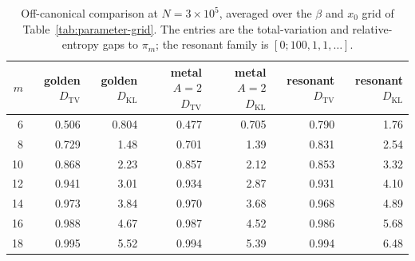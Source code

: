 \begin{table}[t]
\centering
\scriptsize
\setlength{\tabcolsep}{4pt}
\caption{Off-canonical comparison at \(N=3\times 10^5\), averaged over the
\(\beta\) and \(x_0\) grid of Table~\ref{tab:parameter-grid}.  The entries are
the total-variation and relative-entropy gaps to \(\pi_m\); the resonant
family is \([0;100,1,1,\dots]\).}
\label{tab:rotation-parry-gap-summary}
\begin{tabular}{rrrrrrr}
\toprule
\(m\) & golden \(D_{\mathrm{TV}}\) & golden \(D_{\mathrm{KL}}\) & metal \(A=2\) \(D_{\mathrm{TV}}\) & metal \(A=2\) \(D_{\mathrm{KL}}\) & resonant \(D_{\mathrm{TV}}\) & resonant \(D_{\mathrm{KL}}\)\\
\midrule
6  & 0.506 & 0.804 & 0.477 & 0.705 & 0.790 & 1.76\\
8  & 0.729 & 1.48  & 0.701 & 1.39  & 0.831 & 2.54\\
10 & 0.868 & 2.23  & 0.857 & 2.12  & 0.853 & 3.32\\
12 & 0.941 & 3.01  & 0.934 & 2.87  & 0.931 & 4.10\\
14 & 0.973 & 3.84  & 0.970 & 3.68  & 0.968 & 4.89\\
16 & 0.988 & 4.67  & 0.987 & 4.52  & 0.986 & 5.68\\
18 & 0.995 & 5.52  & 0.994 & 5.39  & 0.994 & 6.48\\
\bottomrule
\end{tabular}
\end{table}
